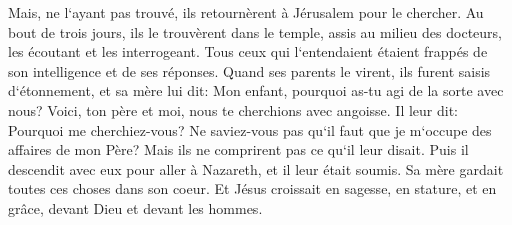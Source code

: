 \verse Mais, ne l`ayant pas trouvé, ils retournèrent à Jérusalem pour le chercher. 
\verse Au bout de trois jours, ils le trouvèrent dans le temple, assis au milieu des docteurs, les écoutant et les interrogeant. 
\verse Tous ceux qui l`entendaient étaient frappés de son intelligence et de ses réponses. 
\verse Quand ses parents le virent, ils furent saisis d`étonnement, et sa mère lui dit: Mon enfant, pourquoi as-tu agi de la sorte avec nous? Voici, ton père et moi, nous te cherchions avec angoisse. 
\verse Il leur dit: Pourquoi me cherchiez-vous? Ne saviez-vous pas qu`il faut que je m`occupe des affaires de mon Père? 
\verse Mais ils ne comprirent pas ce qu`il leur disait. 
\verse Puis il descendit avec eux pour aller à Nazareth, et il leur était soumis. Sa mère gardait toutes ces choses dans son coeur. 
\verse Et Jésus croissait en sagesse, en stature, et en grâce, devant Dieu et devant les hommes. 

\chapter{}


